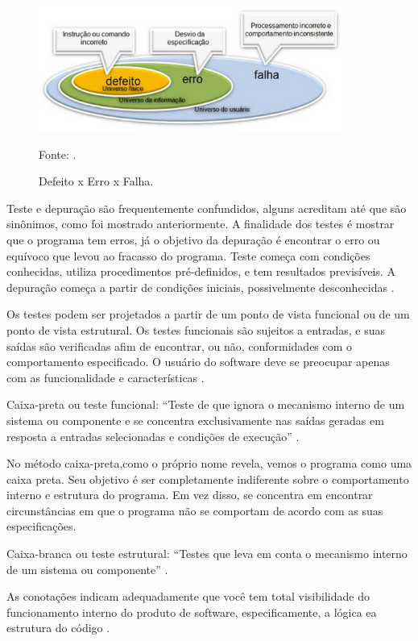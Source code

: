 \begin{figure}[H]
\centering
\includegraphics[width=0.9\textwidth]{figuras/defeitoErroFalha}
\caption{Defeito x Erro x Falha.}{Fonte:  .}
\label{defeitoErroFalha}
\end{figure}

Teste e depuração são frequentemente confundidos, alguns acreditam até que são sinônimos, como foi mostrado anteriormente. A finalidade dos testes é mostrar que o programa tem erros, já o objetivo da depuração é encontrar o erro ou equívoco que levou ao fracasso do programa. Teste começa com condições conhecidas, utiliza procedimentos pré-definidos, e tem resultados previsíveis. A depuração começa a partir de condições iniciais, possivelmente desconhecidas \cite{beizer1990}.

Os testes podem ser projetados a partir de um ponto de vista funcional ou de um ponto de vista estrutural. Os testes funcionais são sujeitos a entradas, e suas saídas são verificadas afim de encontrar, ou não, conformidades com o comportamento especificado. O usuário do software deve se preocupar apenas com as funcionalidade e características \cite{beizer1990}.

Caixa-preta ou teste funcional:  “Teste de que ignora o mecanismo interno de um sistema ou componente e se concentra exclusivamente nas saídas geradas em resposta a entradas selecionadas e condições de execução” \cite{ieee}.

No método caixa-preta,como o próprio nome revela, vemos o programa como uma caixa preta. Seu objetivo é ser completamente indiferente sobre o comportamento interno e estrutura do programa. Em vez disso, se concentra em encontrar circunstâncias em que o programa não se comportam de acordo com as suas especificações\cite[pág.~13]{myers2004}.

Caixa-branca ou teste estrutural: “Testes que leva em conta o mecanismo interno de um sistema ou componente” \cite{ieee}.

 As conotações indicam adequadamente que você tem total visibilidade do funcionamento interno do produto de software, especificamente, a lógica ea estrutura do código \cite[pág.~1]{williams2006}.


